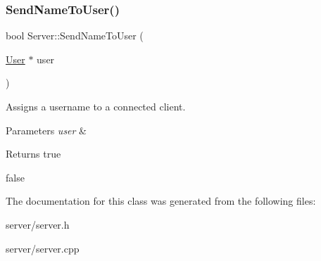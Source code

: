 \subsubsection{\texorpdfstring{Send\+Name\+To\+User()}{SendNameToUser()}}
{\footnotesize\ttfamily bool Server\+::\+Send\+Name\+To\+User (\begin{DoxyParamCaption}\item[{\mbox{\hyperlink{class_user}{User}} $\ast$}]{user }\end{DoxyParamCaption})}



Assigns a username to a connected client. 


\begin{DoxyParams}{Parameters}
{\em user} & \\
\hline
\end{DoxyParams}
\begin{DoxyReturn}{Returns}
true 

false 
\end{DoxyReturn}


The documentation for this class was generated from the following files\+:\begin{DoxyCompactItemize}
\item 
server/server.\+h\item 
server/server.\+cpp\end{DoxyCompactItemize}
